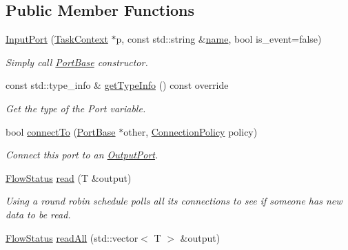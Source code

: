 \subsection*{Public Member Functions}
\begin{DoxyCompactItemize}
\item 
\hypertarget{classcoco_1_1_input_port_a30034afe3a136863e24e37cf7bd18a48}{}\hyperlink{classcoco_1_1_input_port_a30034afe3a136863e24e37cf7bd18a48}{Input\+Port} (\hyperlink{classcoco_1_1_task_context}{Task\+Context} $\ast$p, const std\+::string \&\hyperlink{classcoco_1_1_port_base_abf4eb7fcc3ec9973ee73dd140e7646db}{name}, bool is\+\_\+event=false)\label{classcoco_1_1_input_port_a30034afe3a136863e24e37cf7bd18a48}

\begin{DoxyCompactList}\small\item\em Simply call \hyperlink{classcoco_1_1_port_base}{Port\+Base} constructor. \end{DoxyCompactList}\item 
\hypertarget{classcoco_1_1_input_port_a6b0d4b4de9199a102168c767756d0000}{}const std\+::type\+\_\+info \& \hyperlink{classcoco_1_1_input_port_a6b0d4b4de9199a102168c767756d0000}{get\+Type\+Info} () const override\label{classcoco_1_1_input_port_a6b0d4b4de9199a102168c767756d0000}

\begin{DoxyCompactList}\small\item\em Get the type of the Port variable. \end{DoxyCompactList}\item 
\hypertarget{classcoco_1_1_input_port_a838df83833fa100b992eb96c5cc01536}{}bool \hyperlink{classcoco_1_1_input_port_a838df83833fa100b992eb96c5cc01536}{connect\+To} (\hyperlink{classcoco_1_1_port_base}{Port\+Base} $\ast$other, \hyperlink{structcoco_1_1_connection_policy}{Connection\+Policy} policy)\label{classcoco_1_1_input_port_a838df83833fa100b992eb96c5cc01536}

\begin{DoxyCompactList}\small\item\em Connect this port to an \hyperlink{classcoco_1_1_output_port}{Output\+Port}. \end{DoxyCompactList}\item 
\hypertarget{classcoco_1_1_input_port_a92e1dd40c0f20d207c7098ba9699c89f}{}\hyperlink{namespacecoco_a057be58377e415c9be98c1dc5c8426ad}{Flow\+Status} \hyperlink{classcoco_1_1_input_port_a92e1dd40c0f20d207c7098ba9699c89f}{read} (T \&output)\label{classcoco_1_1_input_port_a92e1dd40c0f20d207c7098ba9699c89f}

\begin{DoxyCompactList}\small\item\em Using a round robin schedule polls all its connections to see if someone has new data to be read. \end{DoxyCompactList}\item 
\hyperlink{namespacecoco_a057be58377e415c9be98c1dc5c8426ad}{Flow\+Status} \hyperlink{classcoco_1_1_input_port_a0936ee02f6f53d6ba6e379477f5e223b}{read\+All} (std\+::vector$<$ T $>$ \&output)
\end{DoxyCompactItemize}
